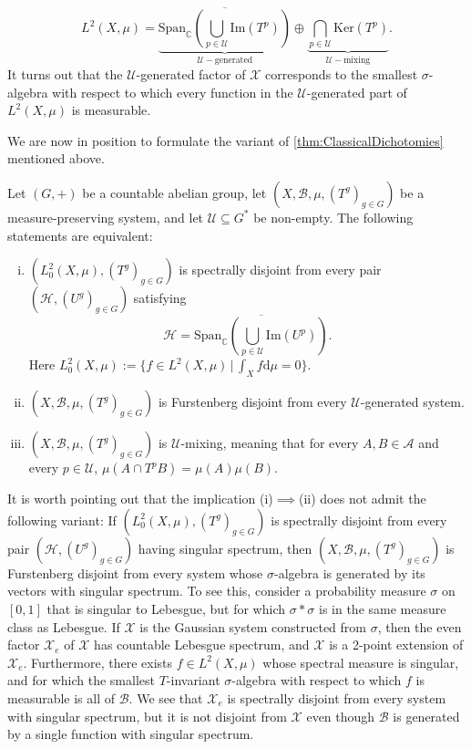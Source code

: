 \documentclass[graybox]{svmult}
\theoremstyle{definition}
\begin{document}
  $$L^2(X,\mu) = \underbrace{\overline{\text{Span}_{\mathbb{C}}\left(\bigcup_{p \in \mathcal{U}}\text{Im}(T^p)\right)}}_{\mathcal{U}-\text{generated}}\oplus\underbrace{\bigcap_{p \in \mathcal{U}}\text{Ker}(T^p)}_{\mathcal{U}-\text{mixing}}.$$
  It turns out that the $\mathcal{U}$-generated factor of $\mathcal{X}$ corresponds to the smallest $\sigma$-algebra with respect to which every function in the $\mathcal{U}$-generated part of $L^2(X,\mu)$ is measurable.

We are now in position to formulate the variant of \cref{thm:ClassicalDichotomies} mentioned above.
\begin{theorem}\label{thm:Disjointness}
    Let $(G,+)$ be a countable abelian group, let $(X,\mathscr{B},\mu,(T^g)_{g\in G})$ be a measure-preserving system, and let $\mathcal U\subseteq G^*$ be non-empty.   The following statements are equivalent:
    \begin{enumerate}[(i)]
    \item $(L_0^2(X,\mu),(T^g)_{g \in G})$ is spectrally disjoint from every pair $(\mathcal H,(U^g)_{g\in G})$
    satisfying 
    $$
\mathcal H=\overline{\text{Span}_{\mathbb C}\left(\bigcup_{p\in\mathcal U} \text{Im}(U^p)\right)}.
    $$
    Here $L_0^2(X,\mu):=\{f\in L^2(X,\mu)\,|\,\int_Xf\text{d}\mu=0\}$.
     \item $(X,\mathscr{B},\mu,(T^g)_{g\in G})$ is Furstenberg disjoint from every $\mathcal U$-generated system. 
      \item $(X,\mathscr{B},\mu,(T^g)_{g\in G})$ is $\mathcal U$-mixing, meaning that for every $A,B\in\mathcal A$ and every $p\in\mathcal U$, $\mu(A\cap T^pB)=\mu(A)\mu(B)$.
    \end{enumerate}
\end{theorem}

\begin{remark}
It is worth pointing out that the implication  (i)$\implies$(ii) does not admit the following variant: If  $(L_0^2(X,\mu),(T^g)_{g \in G})$ is spectrally disjoint from every pair $(\mathcal H,(U^g)_{g\in G})$ having singular spectrum, then $(X,\mathscr{B},\mu,(T^g)_{g\in G})$ is Furstenberg disjoint from every system whose $\sigma$-algebra is generated by its vectors with singular spectrum.
To see this, consider a probability measure $\sigma$ on $[0,1]$ that is singular to Lebesgue, but for which $\sigma*\sigma$ is in the same measure class as Lebesgue.
If $\mathcal{X}$ is the Gaussian system constructed from $\sigma$, then the even factor $\mathcal{X}_e$ of $\mathcal{X}$ has countable Lebesgue spectrum, and $\mathcal{X}$ is a 2-point extension of $\mathcal{X}_e$.
Furthermore, there exists $f \in L^2(X,\mu)$ whose spectral measure is singular, and for which the smallest $T$-invariant $\sigma$-algebra with respect to which $f$ is measurable is all of $\mathscr{B}$.
We see that $\mathcal{X}_e$ is spectrally disjoint from every system with singular spectrum, but it is not disjoint from $\mathcal{X}$ even though $\mathscr{B}$ is generated by a single function with singular spectrum.
\end{remark}
\end{document}
